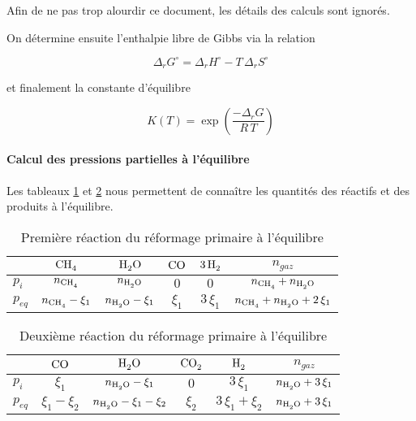 \documentclass[a4paper, oneside, 12pt]{article}
\begin{document}
Afin de ne pas trop alourdir ce document, les détails des calculs sont ignorés. 

On détermine ensuite l'enthalpie libre de Gibbs via la relation 

\begin{equation*}
	\Delta_r G^{\circ} = \Delta_r H^{\circ} 
	- T \, \Delta_r S^{\circ}
\end{equation*}

et finalement la constante d'équilibre 

\[ 
K(T) = \exp{\left(\frac{- \Delta_r G}{R \, T}\right)} 
\]

\paragraph{Calcul des pressions partielles à l'équilibre}

Les tableaux \ref{tab:reaction1_primaire} et \ref{tab:reaction2_primaire} nous 
permettent de conna\^itre les quantités des réactifs et des produits à l'équilibre. 

\begin{table}
	\centering
	\begin{tabular}{l|c|c|c|c|c}
		 & $\ce{CH4}$ & $\ce{H2O}$ & $\ce{CO}$ & $\ce{3H2}$ & $n_{gaz}$ \\
		\hline
		$p_{i}$ & $n_{\ce{CH4}}$ & $n_{\ce{H2O}}$ & $0$ & $0$ &
		$n_{\ce{CH4}} + n_{\ce{H2O}}$ \\
		$p_{eq}$ & $n_{\ce{CH4}} - \xi_1$ & $n_{\ce{H2O}} - \xi_1$ & 
		$\xi_1$ & $3 \, \xi_1$ & $n_{\ce{CH4}} + n_{\ce{H2O}} + 2 \, \xi_1 $\\
	\end{tabular}
	\caption{Première réaction du réformage primaire à l'équilibre}
	\label{tab:reaction1_primaire}
\end{table}

\begin{table}
	\centering
	\begin{tabular}{l|c|c|c|c|c}
		 & $\ce{CO}$ & $\ce{H2O}$ & $\ce{CO2}$ & $\ce{H2}$ & $n_{gaz}$ \\
		\hline
		$p_{i}$ & $\xi_1$ & $n_{\ce{H2O}} - \xi_1$ & $0$ & $3 \, \xi_1$ &
		$n_{\ce{H2O}} + 3 \, \xi_1$ \\
		$p_{eq}$ & $\xi_1 - \xi_2$ & $n_{\ce{H2O}} - \xi_1 - \xi_2$ & 
		$\xi_2$ & $3 \, \xi_1 + \xi_2$ & $n_{\ce{H2O}} + 3 \, \xi_1 $\\
	\end{tabular}
	\caption{Deuxième réaction du réformage primaire à l'équilibre}
	\label{tab:reaction2_primaire}
\end{table}
\end{document}
